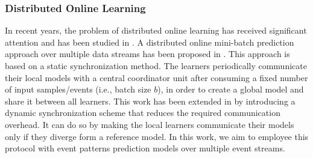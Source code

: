
\subsubsection*{Distributed Online Learning}
\par In recent years, the problem of distributed online learning has received significant attention and has been studied in \cite{langford2009slow,yan2013distributed,xiao2010dual,dekel2012optimal,kamp2014communication}.  A distributed online mini-batch prediction approach over multiple data streams has been proposed in \cite{dekel2012optimal}. This approach is based on a static synchronization method. The learners periodically communicate  their local models with a central coordinator unit after consuming a fixed number of input samples/events (i.e., batch size $b$), in order to  create a global model and share it between all learners. This work has been extended in \cite{kamp2014communication} by introducing a
dynamic synchronization scheme that reduces the required communication overhead. It can do so by making the local learners communicate their models only if they diverge form a reference model. In this work, we aim to employee this protocol with event patterns prediction models over multiple event streams. 
